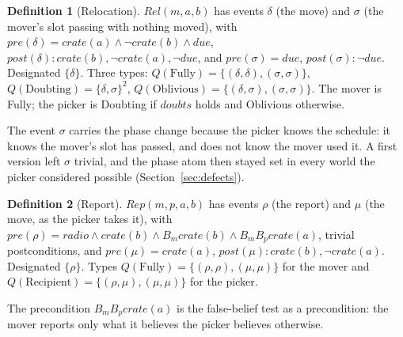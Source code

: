 \documentclass[11pt,a4paper]{article}
\theoremstyle{definition}
\newtheorem{definition}{Definition}
\newcommand{\Bop}[1]{B_{#1}}
\newcommand{\ag}[1]{\mathit{#1}}
\newcommand{\pk}{\ag{p}}
\newcommand{\mv}{\ag{m}}
\newcommand{\crate}{\mathit{crate}}
\newcommand{\pre}{\mathit{pre}}
\newcommand{\post}{\mathit{post}}
\begin{document}
\begin{definition}[Relocation]
\label{def:relocation}
$\mathit{Rel}(\mv, a, b)$ has events $\delta$ (the move) and $\sigma$ (the
mover's slot passing with nothing moved), with
$\pre(\delta) = \crate(a) \wedge \neg\crate(b) \wedge \mathit{due}$,
$\post(\delta) : \crate(b), \neg\crate(a), \neg\mathit{due}$, and
$\pre(\sigma) = \mathit{due}$, $\post(\sigma) : \neg\mathit{due}$. Designated
$\{\delta\}$. Three types:
$Q(\mathrm{Fully}) = \{(\delta,\delta),(\sigma,\sigma)\}$,
$Q(\mathrm{Doubting}) = \{\delta,\sigma\}^2$,
$Q(\mathrm{Oblivious}) = \{(\delta,\sigma),(\sigma,\sigma)\}$.
The mover is Fully; the picker is Doubting if $\mathit{doubts}$ holds and
Oblivious otherwise.
\end{definition}

\noindent
The event $\sigma$ carries the phase change because the picker knows the
schedule: it knows the mover's slot has passed, and does not know the mover
used it. A first version left $\sigma$ trivial, and the phase atom then stayed
set in every world the picker considered possible
(Section~\ref{sec:defects}).

\begin{definition}[Report]
\label{def:report}
$\mathit{Rep}(\mv, \pk, a, b)$ has events $\rho$ (the report) and $\mu$ (the
move, as the picker takes it), with
$\pre(\rho) = \mathit{radio} \wedge \crate(b) \wedge \Bop{\mv}\crate(b) \wedge
\Bop{\mv}\Bop{\pk}\crate(a)$, trivial postconditions, and
$\pre(\mu) = \crate(a)$, $\post(\mu) : \crate(b), \neg\crate(a)$. Designated
$\{\rho\}$. Types $Q(\mathrm{Fully}) = \{(\rho,\rho),(\mu,\mu)\}$ for the mover
and $Q(\mathrm{Recipient}) = \{(\rho,\mu),(\mu,\mu)\}$ for the picker.
\end{definition}

\noindent
The precondition $\Bop{\mv}\Bop{\pk}\crate(a)$ is the false-belief test as a
precondition: the mover reports only what it believes the picker believes
otherwise.
\end{document}
